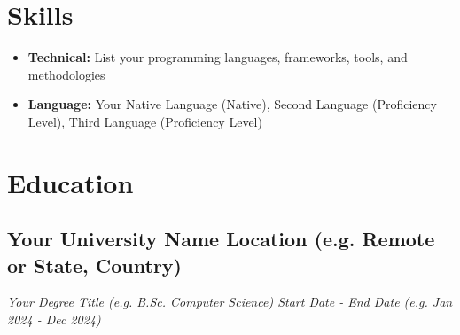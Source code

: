 \documentclass[a4paper,10pt]{article}
\begin{document}

\section{Skills}
    \begin{itemize}
        \item \textbf{Technical:} List your programming languages, frameworks, tools, and methodologies
        \item \textbf{Language:} Your Native Language (Native), Second Language (Proficiency Level), Third Language (Proficiency Level)
    \end{itemize}



\section{Education}
    \subsection*{\texorpdfstring{
            \textbf{Your University Name} \hfill Location (e.g. Remote or State, Country)
        }{
            Your University Name (Education) -- Location
        }}
    \textit{Your Degree Title (e.g. B.Sc. Computer Science) \hfill Start Date - End Date (e.g. Jan 2024 - Dec 2024)}
\end{document}
